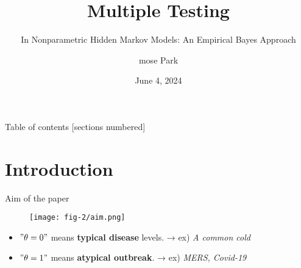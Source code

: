 \documentclass[10pt, aspectratio=169]{beamer}
\title{Multiple Testing}
\subtitle{In Nonparametric Hidden Markov Models:
 An Empirical Bayes Approach}
\date{June 4, 2024}
\author{mose Park}
\institute{Department of Statistical Data Science \\
    University of Seoul}
\begin{document}
\maketitle

\begin{frame}{Table of contents}
  [sections numbered]
  \tableofcontents%
\end{frame}
\section[Intro]{Introduction}
\begin{frame}{Aim of the paper}
    \begin{figure}[h]
    \centering
    \texttt{[image: fig-2/aim.png]}
    \end{figure}

    \begin{itemize}[label=\scalebox{0.5}{$\blacksquare$}]
        \vspace{1.5em}
        \itemsep1.2em
        \item $ "\theta = 0" $ means \textbf{typical disease} levels. → ex) \textit{A common cold}
        \item $ "\theta = 1" $ means \textbf{atypical outbreak}. → ex) \textit{MERS, Covid-19}
    \end{itemize}
\end{frame}
\begin{frame}
    
\end{frame}
\begin{frame}
    
\end{frame}
\begin{frame}
    
\end{frame}
\begin{frame}
    
\end{frame}
\begin{frame}
    
\end{frame}
\begin{frame}
    
\end{frame}
\begin{frame}
    
\end{frame}
\begin{frame}
    
\end{frame}
\begin{frame}
    
\end{frame}
\begin{frame}
    
\end{frame}





\end{document}
